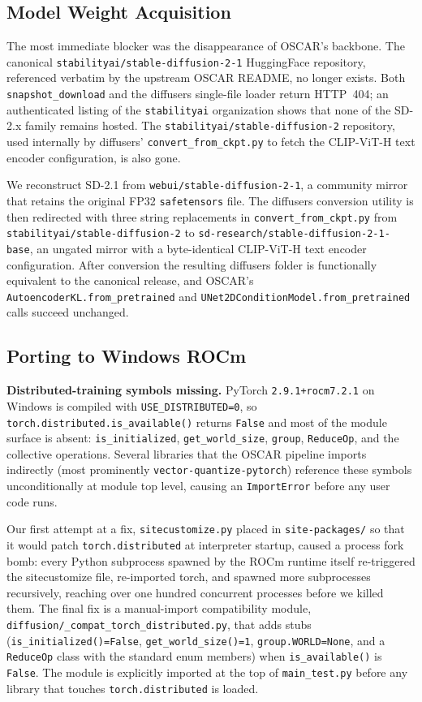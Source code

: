 \documentclass[conference]{IEEEtran}
\begin{document}
\subsection{Model Weight Acquisition}

The most immediate blocker was the disappearance of OSCAR's backbone. The
canonical \texttt{stabilityai/stable-diffusion-2-1} HuggingFace repository,
referenced verbatim by the upstream OSCAR README, no longer exists. Both
\texttt{snapshot\_download} and the diffusers single-file loader return
HTTP~404; an authenticated listing of the \texttt{stabilityai} organization
shows that none of the SD-2.x family remains hosted. The
\texttt{stabilityai/stable-diffusion-2} repository, used internally by
diffusers' \texttt{convert\_from\_ckpt.py} to fetch the CLIP-ViT-H text
encoder configuration, is also gone.

We reconstruct SD-2.1 from \texttt{webui/stable-diffusion-2-1}, a community
mirror that retains the original FP32 \texttt{safetensors} file. The
diffusers conversion utility is then redirected with three string
replacements in \texttt{convert\_from\_ckpt.py} from
\texttt{stabilityai/stable-diffusion-2} to
\texttt{sd-research/stable-diffusion-2-1-base}, an ungated mirror with a
byte-identical CLIP-ViT-H text encoder configuration. After conversion the
resulting diffusers folder is functionally equivalent to the canonical
release, and OSCAR's \texttt{AutoencoderKL.from\_pretrained} and
\texttt{UNet2DConditionModel.from\_pretrained} calls succeed unchanged.

\subsection{Porting to Windows ROCm}

\textbf{Distributed-training symbols missing.} PyTorch
\texttt{2.9.1+rocm7.2.1} on Windows is compiled with
\texttt{USE\_DISTRIBUTED=0}, so \texttt{torch.distributed.is\_available()}
returns \texttt{False} and most of the module surface is absent:
\texttt{is\_initialized}, \texttt{get\_world\_size}, \texttt{group},
\texttt{ReduceOp}, and the collective operations. Several libraries that
the OSCAR pipeline imports indirectly (most prominently
\texttt{vector-quantize-pytorch}) reference these symbols unconditionally at
module top level, causing an \texttt{ImportError} before any user code runs.

Our first attempt at a fix, \texttt{sitecustomize.py} placed in
\texttt{site-packages/} so that it would patch \texttt{torch.distributed} at
interpreter startup, caused a process fork bomb: every Python subprocess
spawned by the ROCm runtime itself re-triggered the sitecustomize file,
re-imported torch, and spawned more subprocesses recursively, reaching over
one hundred concurrent processes before we killed them. The final fix is a
manual-import compatibility module,
\texttt{diffusion/\_compat\_torch\_distributed.py}, that adds stubs
(\texttt{is\_initialized()=False}, \texttt{get\_world\_size()=1},
\texttt{group.WORLD=None}, and a \texttt{ReduceOp} class with the standard
enum members) when \texttt{is\_available()} is \texttt{False}. The module
is explicitly imported at the top of \texttt{main\_test.py} before any
library that touches \texttt{torch.distributed} is loaded.
\end{document}
